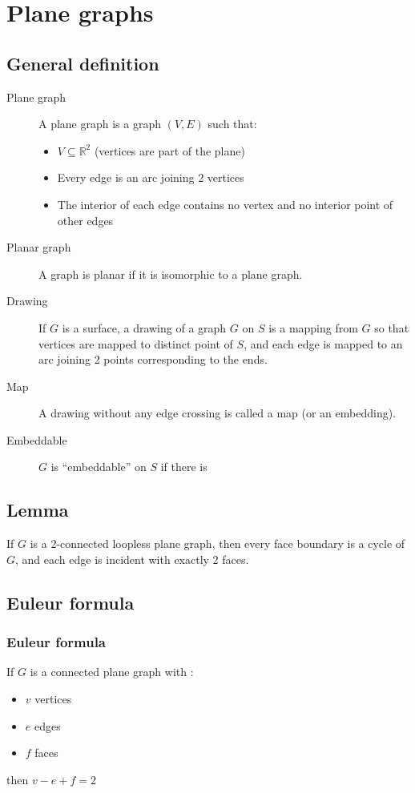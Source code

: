 \chapter{Plane graphs}
    \section{General definition}
        \begin{description}
            \item[Plane graph] A plane graph is a graph $(V, E)$ such that:
                \begin{itemize}
                    \item $V\subseteq \mathbb{R}^2$ (vertices are part of the plane)
                    \item Every edge is an arc joining 2 vertices
                    \item The interior of each edge contains no vertex and no interior point of other edges
                \end{itemize}
            \item[Planar graph] A graph is planar if it is isomorphic to a plane graph.
            \item[Drawing] If $G$ is a surface, a drawing of a graph $G$ on $S$ is a mapping from $G$ so that vertices are mapped to distinct point of $S$, and each edge is mapped to an arc joining 2 points corresponding to the ends.\\
            \item[Map] A drawing without any edge crossing is called a map (or an embedding).\\
            \item[Embeddable] $G$ is ``embeddable'' on $S$ if there is \\
        \end{description}
    \section{Lemma}
        If $G$ is a 2-connected loopless plane graph, then every face boundary is a cycle of $G$, and each edge is incident with exactly 2 faces.
    \section{Euleur formula}
        \subsection{Euleur formula}
            If $G$ is a connected plane graph with :
            \begin{itemize}
                \item $v$ vertices
                \item $e$ edges
                \item $f$ faces
            \end{itemize}
            then $v-e+f=2$
